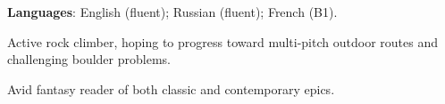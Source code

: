 \begin{zitemize}
    \setlength\itemsep{0.1em}
    \item \textbf{Languages}: English (fluent); Russian (fluent); French (B1).
    \item Active rock climber, hoping to progress toward multi-pitch outdoor routes and challenging boulder problems.
    \item Avid fantasy reader of both classic and contemporary epics.
\end{zitemize}